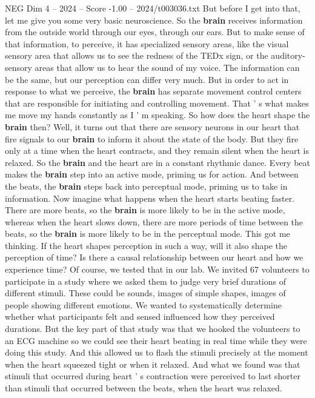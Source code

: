 \begin{textsample}{NEG Dim 4 – 2024 – Score -1.00 – 2024/t003036.txt}
But before I get into that, let me give you some very basic neuroscience.
So the \textbf{brain} receives information from the outside world through our eyes, through our ears.
But to make sense of that information, to perceive, it has specialized sensory areas, like the visual sensory area that allows us to see the redness of the TEDx sign, or the auditory-sensory areas that allow us to hear the sound of my voice.
The information can be the same, but our perception can differ very much.
But in order to act in response to what we perceive, the \textbf{brain} has separate movement control centers that are responsible for initiating and controlling movement.
That ' s what makes me move my hands constantly as I ' m speaking.
So how does the heart shape the \textbf{brain} then?
Well, it turns out that there are sensory neurons in our heart that fire signals to our \textbf{brain} to inform it about the state of the body.
But they fire only at a time when the heart contracts, and they remain silent when the heart is relaxed.
So the \textbf{brain} and the heart are in a constant rhythmic dance.
Every beat makes the \textbf{brain} step into an active mode, priming us for action.
And between the beats, the \textbf{brain} steps back into perceptual mode, priming us to take in information.
Now imagine what happens when the heart starts beating faster.
There are more beats, so the \textbf{brain} is more likely to be in the active mode, whereas when the heart slows down, there are more periods of time between the beats, so the \textbf{brain} is more likely to be in the perceptual mode.
This got me thinking.
If the heart shapes perception in such a way, will it also shape the perception of time?
Is there a causal relationship between our heart and how we experience time?
Of course, we tested that in our lab.
We invited 67 volunteers to participate in a study where we asked them to judge very brief durations of different stimuli.
These could be sounds, images of simple shapes, images of people showing different emotions.
We wanted to systematically determine whether what participants felt and sensed influenced how they perceived durations.
But the key part of that study was that we hooked the volunteers to an ECG machine so we could see their heart beating in real time while they were doing this study.
And this allowed us to flash the stimuli precisely at the moment when the heart squeezed tight or when it relaxed.
And what we found was that stimuli that occurred during heart ' s contraction were perceived to last shorter than stimuli that occurred between the beats, when the heart was relaxed.

\end{textsample}
